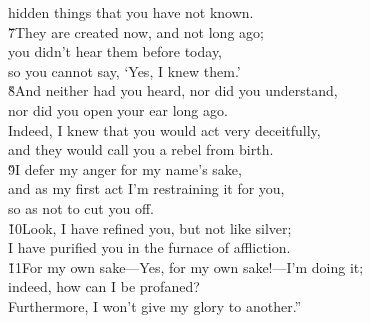 \begin{poetry}
\poemll    hidden things that you have not known. \\
\poeml \v{7}They are created now, and not long ago; \\
\poemll    you didn't hear them before today, \\
\poemlll       so you cannot say, `Yes, I knew them.' \\
\poeml \v{8}And neither had you heard, nor did you understand, \\
\poemll    nor did you open your ear long ago. \\
\poeml Indeed, I knew that you would act very deceitfully, \\
\poemll    and they would call you a rebel from birth. \\
\poeml \v{9}I defer my anger for my name's sake, \\
\poemll    and as my first act I'm restraining it for you, \\
\poemlll       so as not to cut you off. \\
\poeml \v{10}Look, I have refined you, but not like silver; \\
\poemll    I have purified you in the furnace of affliction. \\
\poeml \v{11}For my own sake---Yes, for my own sake!---I'm doing it; \\
\poemll    indeed, how can I be profaned? \\
\poemlll       Furthermore, I won't give my glory to another.''

\end{poetry}
